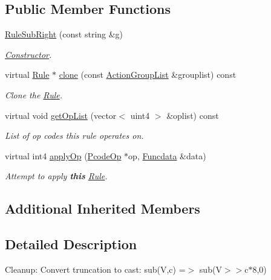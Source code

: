 \subsection*{Public Member Functions}
\begin{DoxyCompactItemize}
\item 
\mbox{\hyperlink{class_rule_sub_right_a3a3120b841b557dec91ccb845bb46ce6}{Rule\+Sub\+Right}} (const string \&g)
\begin{DoxyCompactList}\small\item\em \mbox{\hyperlink{class_constructor}{Constructor}}. \end{DoxyCompactList}\item 
virtual \mbox{\hyperlink{class_rule}{Rule}} $\ast$ \mbox{\hyperlink{class_rule_sub_right_afb228c3e1286d3fca825a105c0c85870}{clone}} (const \mbox{\hyperlink{class_action_group_list}{Action\+Group\+List}} \&grouplist) const
\begin{DoxyCompactList}\small\item\em Clone the \mbox{\hyperlink{class_rule}{Rule}}. \end{DoxyCompactList}\item 
virtual void \mbox{\hyperlink{class_rule_sub_right_a78d7843a5979bc62ba052f6031d1f49b}{get\+Op\+List}} (vector$<$ uint4 $>$ \&oplist) const
\begin{DoxyCompactList}\small\item\em List of op codes this rule operates on. \end{DoxyCompactList}\item 
virtual int4 \mbox{\hyperlink{class_rule_sub_right_a41e3a0031c161d828b8a32239d2c965e}{apply\+Op}} (\mbox{\hyperlink{class_pcode_op}{Pcode\+Op}} $\ast$op, \mbox{\hyperlink{class_funcdata}{Funcdata}} \&data)
\begin{DoxyCompactList}\small\item\em Attempt to apply {\bfseries{this}} \mbox{\hyperlink{class_rule}{Rule}}. \end{DoxyCompactList}\end{DoxyCompactItemize}
\subsection*{Additional Inherited Members}


\subsection{Detailed Description}
Cleanup\+: Convert truncation to cast\+: {\ttfamily sub(\+V,c) =$>$ sub(V$>$$>$c$\ast$8,0)} 


